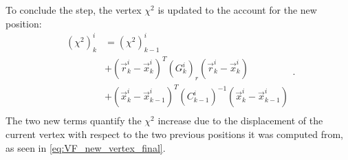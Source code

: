 To conclude the step, the vertex $\chi^2$ is updated to the account for the new position:
\begin{equation}
\begin{aligned}
	{(\chi^2)}_k^i &= {(\chi^2)}_{k-1}^i \\
	&+
	{\left(\vec{r}_{k}^i - \vec{x}_k^i\right)}^T  {(G_k^i)}_r \left(\vec{r}_{k}^i - \vec{x}_k^i \right) \\
	&+
	{\left(\vec{x}_k^i - \vec{x}_{k-1}^i\right)}^T  {(C_{k-1}^i)}^{-1} \left(\vec{x}_k^i - \vec{x}_{k-1}^i\right) \\
\end{aligned}.
\label{eq:VF_vertex_chi2_final}
\end{equation}
The two new terms quantify the $\chi^2$ increase due to the displacement of the current vertex with respect to the two previous positions it was computed from, as seen in \eqref{eq:VF_new_vertex_final}.



